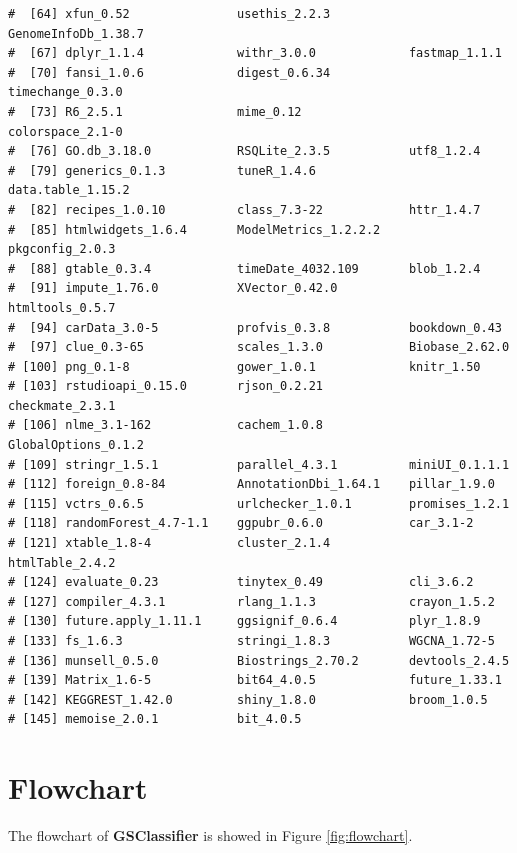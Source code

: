 \documentclass[
  12pt,
]{book}
\begin{document}
\begin{lstlisting}
#  [64] xfun_0.52               usethis_2.2.3           GenomeInfoDb_1.38.7    
#  [67] dplyr_1.1.4             withr_3.0.0             fastmap_1.1.1          
#  [70] fansi_1.0.6             digest_0.6.34           timechange_0.3.0       
#  [73] R6_2.5.1                mime_0.12               colorspace_2.1-0       
#  [76] GO.db_3.18.0            RSQLite_2.3.5           utf8_1.2.4             
#  [79] generics_0.1.3          tuneR_1.4.6             data.table_1.15.2      
#  [82] recipes_1.0.10          class_7.3-22            httr_1.4.7             
#  [85] htmlwidgets_1.6.4       ModelMetrics_1.2.2.2    pkgconfig_2.0.3        
#  [88] gtable_0.3.4            timeDate_4032.109       blob_1.2.4             
#  [91] impute_1.76.0           XVector_0.42.0          htmltools_0.5.7        
#  [94] carData_3.0-5           profvis_0.3.8           bookdown_0.43          
#  [97] clue_0.3-65             scales_1.3.0            Biobase_2.62.0         
# [100] png_0.1-8               gower_1.0.1             knitr_1.50             
# [103] rstudioapi_0.15.0       rjson_0.2.21            checkmate_2.3.1        
# [106] nlme_3.1-162            cachem_1.0.8            GlobalOptions_0.1.2    
# [109] stringr_1.5.1           parallel_4.3.1          miniUI_0.1.1.1         
# [112] foreign_0.8-84          AnnotationDbi_1.64.1    pillar_1.9.0           
# [115] vctrs_0.6.5             urlchecker_1.0.1        promises_1.2.1         
# [118] randomForest_4.7-1.1    ggpubr_0.6.0            car_3.1-2              
# [121] xtable_1.8-4            cluster_2.1.4           htmlTable_2.4.2        
# [124] evaluate_0.23           tinytex_0.49            cli_3.6.2              
# [127] compiler_4.3.1          rlang_1.1.3             crayon_1.5.2           
# [130] future.apply_1.11.1     ggsignif_0.6.4          plyr_1.8.9             
# [133] fs_1.6.3                stringi_1.8.3           WGCNA_1.72-5           
# [136] munsell_0.5.0           Biostrings_2.70.2       devtools_2.4.5         
# [139] Matrix_1.6-5            bit64_4.0.5             future_1.33.1          
# [142] KEGGREST_1.42.0         shiny_1.8.0             broom_1.0.5            
# [145] memoise_2.0.1           bit_4.0.5
\end{lstlisting}

\hypertarget{flowchart}{%
\section{Flowchart}\label{flowchart}}

The flowchart of \textbf{GSClassifier} is showed in Figure \ref{fig:flowchart}.
\end{document}
